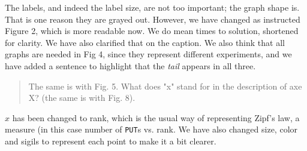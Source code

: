 \documentclass[preprint]{elsarticle}
\begin{document}
The labels, and indeed the label size, are not too important; the
graph shape is. That is one reason they are grayed out. However, we
have changed as instructed Figure 2, which is more readable now. We do
mean times to solution, shortened for clarity. We have also clarified
that on the caption. We also think that all graphs are needed in Fig
4, since they represent different experiments, and we have added a
sentence to highlight that the {\em tail} appears in all three. 

\begin{quote}
The same is with Fig. 5. What does "x" stand for in the description of
axe X? (the same is with Fig. 8).
\end{quote}

$x$ has been changed to {\sf rank}, which is the usual way of
representing Zipf's law, a measure (in this case number of {\tt PUT}s
vs. rank. We have also changed size, color and sigils to represent
each point to make it a bit clearer. 
\end{document}
